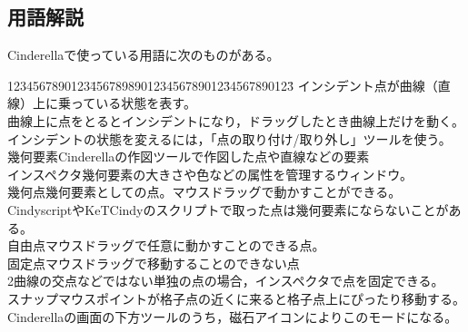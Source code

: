 \documentclass[papersize,a4paper,12pt,uplatex]{jsarticle}
\begin{document}
\subsection{用語解説} 
Cinderellaで使っている用語に次のものがある。
\begin{tabbing}
1234567890123\=456789890123456789012\=34567890123\=\kill
インシデント\>点が曲線（直線）上に乗っている状態を表す。\\
\>曲線上に点をとるとインシデントになり，ドラッグしたとき曲線上だけを動く。\\
\>インシデントの状態を変えるには，「点の取り付け/取り外し」ツールを使う。\\
幾何要素\>Cinderellaの作図ツールで作図した点や直線などの要素\\
インスペクタ\>幾何要素の大きさや色などの属性を管理するウィンドウ。\\
幾何点\>幾何要素としての点。マウスドラッグで動かすことができる。\\
\>CindyscriptやKeTCindyのスクリプトで取った点は幾何要素にならないことがある。\\
自由点\>マウスドラッグで任意に動かすことのできる点。\\
固定点\>マウスドラッグで移動することのできない点\\
\>2曲線の交点などではない単独の点の場合，インスペクタで点を固定できる。\\ 
スナップ\>マウスポイントが格子点の近くに来ると格子点上にぴったり移動する。\\
\>Cinderellaの画面の下方ツールのうち，磁石アイコンによりこのモードになる。\\
 \end{tabbing}
 
\hypertarget{geometrytool}{}
\end{document}
